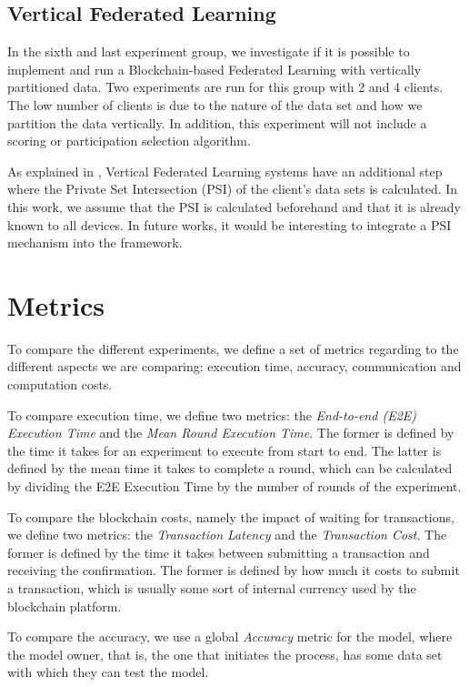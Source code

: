 \subsection{Vertical Federated Learning}

In the sixth and last experiment group, we investigate if it is possible to implement and run a Blockchain-based Federated Learning with vertically partitioned data. Two experiments are run for this group with 2 and 4 clients. The low number of clients is due to the nature of the data set and how we partition the data vertically. In addition, this experiment will not include a scoring or participation selection algorithm.

As explained in , Vertical Federated Learning systems have an additional step where the Private Set Intersection (PSI) of the client's data sets is calculated. In this work, we assume that the PSI is calculated beforehand and that it is already known to all devices. In future works, it would be interesting to integrate a PSI mechanism into the framework.

\section{Metrics}\label{meth:metrics}

To compare the different experiments, we define a set of metrics regarding to the different aspects we are comparing: execution time, accuracy, communication and computation costs.

To compare execution time, we define two metrics: the \textit{End-to-end (E2E) Execution Time} and the \textit{Mean Round Execution Time}. The former is defined by the time it takes for an experiment to execute from start to end. The latter is defined by the mean time it takes to complete a round, which can be calculated by dividing the E2E Execution Time by the number of rounds of the experiment.

To compare the blockchain costs, namely the impact of waiting for transactions, we define two metrics: the \textit{Transaction Latency} and the \textit{Transaction Cost}. The former is defined by the time it takes between submitting a transaction and receiving the confirmation. The former is defined by how much it costs to submit a transaction, which is usually some sort of internal currency used by the blockchain platform.

To compare the accuracy, we use a global \textit{Accuracy} metric for the model, where the model owner, that is, the one that initiates the process, has some data set with which they can test the model.

